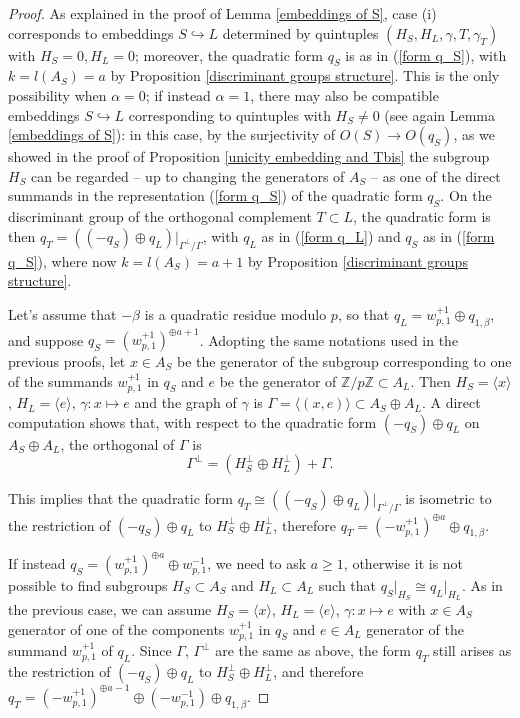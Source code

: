 \documentclass{amsart}
\theoremstyle{definition}
\newcommand{\ra}{\rightarrow}
\newcommand{\IZ}{\mathbb{Z}}
\begin{document}
\begin{proof}
As explained in the proof of Lemma \ref{embeddings of S}, case (i) corresponds to embeddings $S \hookrightarrow L$ determined by quintuples $(H_S, H_L, \gamma, T, \gamma_T)$ with $H_S= 0, H_L = 0$; moreover, the quadratic form $q_S$ is as in (\ref{form q_S}), with $k = l(A_S) = a$ by Proposition \ref{discriminant groups structure}. This is the only possibility when $\alpha = 0$; if instead $\alpha = 1$, there may also be compatible embeddings $S \hookrightarrow L$ corresponding to quintuples with $H_S \neq 0$ (see again Lemma \ref{embeddings of S}): in this case, by the surjectivity of $O(S) \ra O(q_S)$, as we showed in the proof of Proposition \ref{unicity embedding and Tbis} the subgroup $H_S$ can be regarded -- up to changing the generators of $A_S$ -- as one of the direct summands in the representation (\ref{form q_S}) of the quadratic form $q_S$. On the discriminant group of the orthogonal complement $T \subset L$, the quadratic form is then $q_T = ((-q_S)\oplus q_L)\rvert_{\Gamma^\perp/\Gamma}$, with $q_L$ as in (\ref{form q_L}) and $q_S$ as in (\ref{form q_S}), where now $k = l(A_S) = a+1$ by Proposition \ref{discriminant groups structure}.

Let's assume that $-\beta$ is a quadratic residue modulo $p$, so that $q_L = w^{+1}_{p,1} \oplus q_{1, \beta}$, and suppose $q_S = \left( w^{+1}_{p,1} \right)^{\oplus a+1}$. Adopting the same notations used in the previous proofs, let $x \in A_S$ be the generator of the subgroup corresponding to one of the summands $w^{+1}_{p,1}$ in $q_S$ and $e$ be the generator of $\IZ/p \IZ \subset A_L$. Then $H_S = \langle x\rangle$, $H_L = \langle e\rangle$, $\gamma: x \mapsto e$ and the graph of $\gamma$ is $\Gamma = \langle (x,e)\rangle \subset A_S \oplus A_L$. A direct computation shows that, with respect to the quadratic form $(-q_S) \oplus q_L$ on $A_S \oplus A_L$, the orthogonal of $\Gamma$ is
\[ \Gamma^\perp = \left( H_S^\perp \oplus H_L^\perp \right) + \Gamma.\]

This implies that the quadratic form $q_T \cong ((-q_S)\oplus q_L)\rvert_{\Gamma^\perp/\Gamma}$ is isometric to the restriction of $(-q_S)\oplus q_L$ to $H_S^\perp \oplus H_L^\perp$, therefore $q_T = \left( -w^{+1}_{p,1} \right)^{\oplus a} \oplus q_{1, \beta}$.

If instead $q_S = \left( w^{+1}_{p,1} \right)^{\oplus a} \oplus w^{-1}_{p,1}$, we need to ask $a \geq 1$, otherwise it is not possible to find subgroups $H_S \subset A_S$ and $H_L \subset A_L$ such that $q_{S}\rvert_{H_S} \cong q_{L}\rvert_{H_L}$. As in the previous case, we can assume $H_S = \langle x\rangle$, $H_L = \langle e\rangle$, $\gamma: x \mapsto e$ with $x \in A_S$ generator of one of the components $w^{+1}_{p,1}$ in $q_S$ and $e \in A_L$ generator of the summand $w^{+1}_{p,1}$ of $q_L$. Since $\Gamma$, $\Gamma^\perp$ are the same as above, the form $q_T$ still arises as the restriction of $(-q_S)\oplus q_L$ to $H_S^\perp \oplus H_L^\perp$, and therefore $q_T = \left(- w^{+1}_{p,1} \right)^{\oplus a-1} \oplus (-w^{-1}_{p,1}) \oplus q_{1, \beta}$.


\end{proof}
\end{document}
